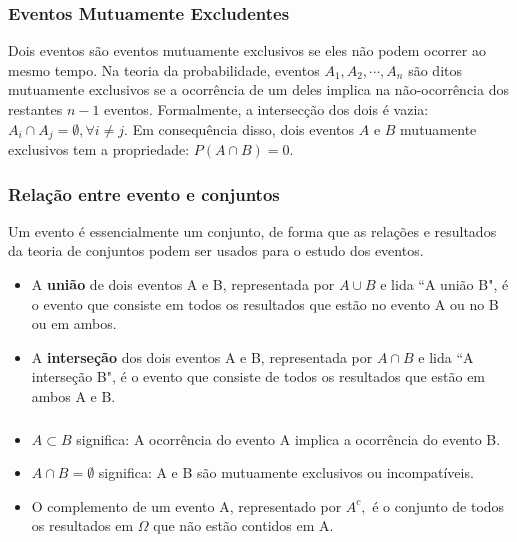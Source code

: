 \documentclass[14pt,aspectratio=1610]{beamer}
\begin{document}
\begin{frame}{}
\frametitle{Eventos Mutuamente Excludentes}
\begin{block}{}
\justifying
Dois eventos são eventos mutuamente exclusivos se eles não podem ocorrer ao mesmo tempo. Na teoria da probabilidade, eventos $A_{1}, A_{2},\cdots, A_{n}$ são ditos mutuamente exclusivos se a ocorrência de um deles implica na não-ocorrência dos restantes $n - 1$ eventos. Formalmente, a intersecção dos dois é vazia: 
$A_{i}\cap A_{j} =\emptyset, \forall i\neq j.$ Em consequência disso, dois eventos $A$ e $B$ mutuamente exclusivos tem a propriedade: $P(A\cap B) = 0.$
\end{block}
\end{frame}

\begin{frame}{}
\frametitle{Relação entre evento e conjuntos}
\begin{block}{}
\justifying
Um evento é essencialmente um conjunto, de forma que as relações e resultados da teoria de conjuntos podem ser usados para o estudo dos eventos. 
\begin{itemize}
\item \justifying A {\bf união} de dois eventos A e B, representada por $A\cup B$ e lida ``A união B", é o evento que consiste em todos os resultados que estão no evento A ou no B ou em ambos. \pause
\item \justifying A {\bf interseção} dos dois eventos A e B, representada por $A\cap B$ e lida ``A interseção B", é o evento que consiste de todos os resultados que estão em ambos A e B. 
\end{itemize}
\end{block}
\end{frame}

\begin{frame}{}
\frametitle{}
\begin{block}{}
\justifying
\begin{itemize}
\item \justifying $A\subset B$ significa: A ocorrência do evento A implica a ocorrência do evento B. \pause
\item \justifying $A\cap B=\emptyset$ significa: A e B são mutuamente exclusivos ou incompatíveis.\pause
\item \justifying O complemento de um evento A, representado por $A^{c},$ é o conjunto de todos os resultados em $\Omega$ que não estão contidos em A.
\end{itemize}
\end{block}
\end{frame}
\end{document}
